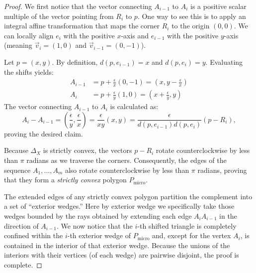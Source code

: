 \documentclass[10pt,a4paper]{amsart}
\begin{document}
\begin{proof}
We first notice that the vector connecting $A_{i-1}$ to $A_i$ is a positive scalar multiple of the vector pointing from $R_i$ to $p$. One way to see this is to apply an integral affine transformation that maps the corner $R_i$ to the origin $(0,0)$. We can locally align $e_i$ with the positive $x$-axis and $e_{i-1}$ with the positive $y$-axis (meaning $\vec{v}_i = (1,0)$ and $\vec{v}_{i-1} = (0,-1)$).

Let $p = (x,y)$. By definition, $d(p, e_{i-1}) = x$ and $d(p, e_i) = y$. Evaluating the shifts yields:
\begin{align*}
    A_{i-1} &= p + \frac{\epsilon}{x} (0,-1) = \left(x, y - \frac{\epsilon}{x}\right) \\
    A_i &= p + \frac{\epsilon}{y} (1,0) = \left(x + \frac{\epsilon}{y}, y\right)
\end{align*}
The vector connecting $A_{i-1}$ to $A_i$ is calculated as:
\begin{equation}
    A_i - A_{i-1} = \left(\frac{\epsilon}{y}, \frac{\epsilon}{x}\right) = \frac{\epsilon}{xy} (x,y) = \frac{\epsilon}{d(p, e_{i-1}) d(p, e_i)} (p - R_i),
\end{equation} proving the desired claim.

Because $\Delta_X$ is strictly convex, the vectors $p - R_i$ rotate counterclockwise by less than $\pi$ radians as we traverse the corners. Consequently, the edges of the sequence $A_1, \dots, A_m$ also rotate counterclockwise by less than $\pi$ radians, proving that they form a \emph{strictly convex} polygon $P_{\text{micro}}$.

The extended edges of any strictly convex polygon partition the complement into a set of ``exterior wedges.'' Here by exterior wedge we specifically take those wedges bounded by the rays obtained by extending each edge $A_iA_{i-1}$ in the direction of $A_{i-1}$. We now notice that the  $i$-th shifted triangle is completely confined within the $i$-th exterior wedge of $P_{\text{micro}}$ and, except for the vertex $A_i$, is contained in the interior of that exterior wedge. Because the unions of the interiors with their vertices (of each wedge) are pairwise disjoint, the proof is complete.
\end{proof}
\end{document}
